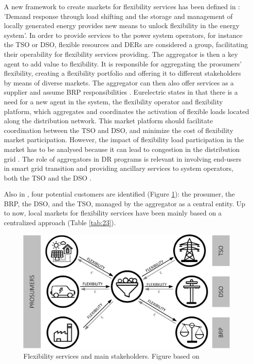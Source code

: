 A new framework to create markets for flexibility services has been defined in \cite{Ulbig2015,USEFFoundation2015a}: 'Demand response through load shifting and the storage and management of locally generated energy provides new means to unlock flexibility in the energy system'. In order to provide services to the power system operators, for instance the TSO or DSO, flexible resources and DERs are considered a group, facilitating their operability for flexibility services providing. The aggregator is then a key agent to add value to flexibility. It is responsible for aggregating the prosumers' flexibility, creating a flexibility portfolio and offering it to different stakeholders by means of diverse markets. The aggregator can then also offer services as a supplier and assume BRP responsibilities \cite{MarketDesignENTSOE}. Eurelectric states in \cite{mandatova2014flexibility} that there is a need for a new agent in the system, the flexibility operator and flexibility platform, which aggregates and coordinates the activation of flexible loads located along the distribution network. This market platform should facilitate coordination between the TSO and DSO, and minimize the cost of flexibility market participation. However, the impact of flexibility load participation in the market has to be analysed because it can lead to congestion in the distribution grid \cite{esterl2016impact}. The role of aggregators in DR programs is relevant in involving end-users in smart grid transition and providing ancillary services to system operators, both the TSO and the DSO \cite{Carreiro2017}.

Also in \cite{USEFFoundation2015a}, four potential customers are identified (Figure \ref{figure210}): the prosumer, the BRP, the DSO, and the TSO, managed by the aggregator as a central entity. Up to now, local markets for flexibility services have been mainly based on a centralized approach (Table \ref{tab:23}).

\begin{figure}[h]
	\centering
	\includegraphics[width=0.9\columnwidth ]{ChapterIntro/Figures/Figure2.10.jpg}
		\caption{Flexibility services and main stakeholders. Figure based on \cite{USEFFoundation2015a} }  
	\label{figure210}
\end{figure}

